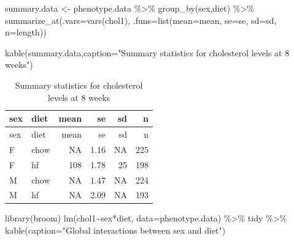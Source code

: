 \documentclass[
]{article}
\newenvironment{Shaded}{\begin{snugshade}}{\end{snugshade}}
\newcommand{\AttributeTok}[1]{\textcolor[rgb]{0.77,0.63,0.00}{#1}}
\newcommand{\FunctionTok}[1]{\textcolor[rgb]{0.00,0.00,0.00}{#1}}
\newcommand{\NormalTok}[1]{#1}
\newcommand{\OtherTok}[1]{\textcolor[rgb]{0.56,0.35,0.01}{#1}}
\newcommand{\SpecialCharTok}[1]{\textcolor[rgb]{0.00,0.00,0.00}{#1}}
\newcommand{\StringTok}[1]{\textcolor[rgb]{0.31,0.60,0.02}{#1}}
\begin{document}
\begin{Shaded}
\begin{Highlighting}[]
\NormalTok{summary.data }\OtherTok{\textless{}{-}}
\NormalTok{  phenotype.data }\SpecialCharTok{\%\textgreater{}\%}
  \FunctionTok{group\_by}\NormalTok{(sex,diet) }\SpecialCharTok{\%\textgreater{}\%}
  \FunctionTok{summarize\_at}\NormalTok{(}\AttributeTok{.vars=}\FunctionTok{vars}\NormalTok{(chol1), }\AttributeTok{.funs=}\FunctionTok{list}\NormalTok{(}\AttributeTok{mean=}\NormalTok{mean,}
                                             \AttributeTok{se=}\NormalTok{se,}
                                             \AttributeTok{sd=}\NormalTok{sd,}
                                             \AttributeTok{n=}\NormalTok{length))}

\FunctionTok{kable}\NormalTok{(summary.data,}\AttributeTok{caption=}\StringTok{"Summary statistics for cholesterol levels at 8 weeks"}\NormalTok{)}
\end{Highlighting}
\end{Shaded}

\begin{longtable}[]{@{}llrrrr@{}}
\caption{Summary statistics for cholesterol levels at 8
weeks}\tabularnewline
\toprule()
sex & diet & mean & se & sd & n \\
\midrule()
\endfirsthead
\toprule()
sex & diet & mean & se & sd & n \\
\midrule()
\endhead
F & chow & NA & 1.16 & NA & 225 \\
F & hf & 108 & 1.78 & 25 & 198 \\
M & chow & NA & 1.47 & NA & 224 \\
M & hf & NA & 2.09 & NA & 193 \\
\bottomrule()
\end{longtable}

\begin{Shaded}
\begin{Highlighting}[]
\FunctionTok{library}\NormalTok{(broom)}
\FunctionTok{lm}\NormalTok{(chol1}\SpecialCharTok{\textasciitilde{}}\NormalTok{sex}\SpecialCharTok{*}\NormalTok{diet, }\AttributeTok{data=}\NormalTok{phenotype.data) }\SpecialCharTok{\%\textgreater{}\%}
\NormalTok{  tidy }\SpecialCharTok{\%\textgreater{}\%}
  \FunctionTok{kable}\NormalTok{(}\AttributeTok{caption=}\StringTok{"Global interactions between sex and diet"}\NormalTok{)}
\end{Highlighting}
\end{Shaded}
\end{document}
